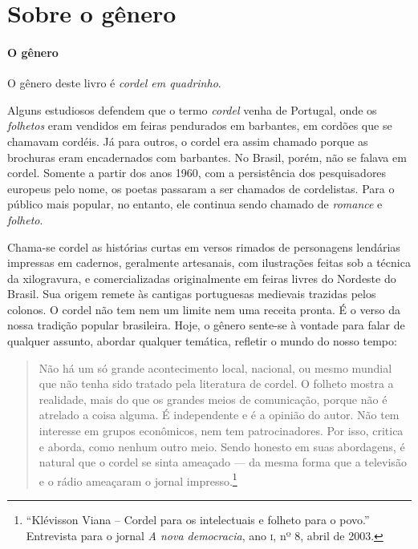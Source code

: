 \documentclass[11pt]{extarticle}
\begin{document}

\section{Sobre o gênero}

\paragraph{O gênero} O gênero deste livro é \textit{cordel em quadrinho}. 



Alguns estudiosos defendem que o termo \textit{cordel} venha de Portugal, onde os \textit{folhetos} eram vendidos em feiras pendurados em barbantes, em cordões que se chamavam cordéis. Já para outros, o cordel era assim chamado porque as brochuras eram encadernados com barbantes. No Brasil, porém, não se falava em cordel. Somente a partir dos anos 1960, com a persistência dos pesquisadores europeus pelo nome, os poetas passaram a ser chamados de cordelistas. Para o público mais popular, no entanto, ele continua sendo chamado de \textit{romance} e \textit{folheto}.

Chama-se cordel as histórias curtas em versos rimados de personagens lendárias impressas em cadernos, geralmente artesanais, com ilustrações feitas sob a técnica da 
xilogravura, e comercializadas originalmente em feiras livres do Nordeste do Brasil. 
Sua origem remete às cantigas portuguesas medievais trazidas pelos colonos.
O cordel não tem nem um limite nem uma receita pronta. É o verso da 
nossa tradição popular brasileira. Hoje, o gênero sente-se à vontade para falar de qualquer 
assunto, abordar qualquer temática, refletir o mundo do nosso tempo:

\begin{quote}
Não há um só grande acontecimento local, nacional, ou mesmo mundial que não tenha sido tratado pela literatura de cordel. O folheto mostra a realidade, mais do que os grandes meios de comunicação, porque não é atrelado a coisa alguma. É independente e é a opinião do autor. Não tem interesse em grupos econômicos, nem tem patrocinadores. Por isso, critica e aborda, como nenhum outro meio. 
Sendo honesto em suas abordagens, é natural que o cordel se sinta ameaçado --- da mesma forma que  a televisão e o rádio ameaçaram o jornal impresso.\footnote{``Klévisson Viana -- Cordel para os intelectuais e folheto para o povo.'' Entrevista para o jornal \textit{A nova democracia}, ano \textsc{i}, nº 8, abril de 2003.}
\end{quote}
\end{document}

